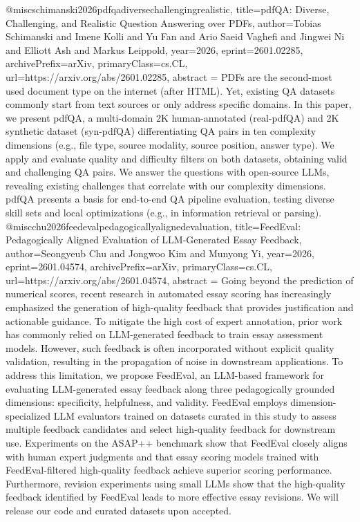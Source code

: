 {}@misc{schimanski2026pdfqadiversechallengingrealistic,
      title={pdfQA: Diverse, Challenging, and Realistic Question Answering over PDFs}, 
      author={Tobias Schimanski and Imene Kolli and Yu Fan and Ario Saeid Vaghefi and Jingwei Ni and Elliott Ash and Markus Leippold},
      year={2026},
      eprint={2601.02285},
      archivePrefix={arXiv},
      primaryClass={cs.CL},
      url={https://arxiv.org/abs/2601.02285},
      abstract = {PDFs are the second-most used document type on the internet (after HTML). Yet, existing QA datasets commonly start from text sources or only address specific domains. In this paper, we present pdfQA, a multi-domain 2K human-annotated (real-pdfQA) and 2K synthetic dataset (syn-pdfQA) differentiating QA pairs in ten complexity dimensions (e.g., file type, source modality, source position, answer type). We apply and evaluate quality and difficulty filters on both datasets, obtaining valid and challenging QA pairs. We answer the questions with open-source LLMs, revealing existing challenges that correlate with our complexity dimensions. pdfQA presents a basis for end-to-end QA pipeline evaluation, testing diverse skill sets and local optimizations (e.g., in information retrieval or parsing).}
}@misc{chu2026feedevalpedagogicallyalignedevaluation,
      title={FeedEval: Pedagogically Aligned Evaluation of LLM-Generated Essay Feedback}, 
      author={Seongyeub Chu and Jongwoo Kim and Munyong Yi},
      year={2026},
      eprint={2601.04574},
      archivePrefix={arXiv},
      primaryClass={cs.CL},
      url={https://arxiv.org/abs/2601.04574},
      abstract = {Going beyond the prediction of numerical scores, recent research in automated essay scoring has increasingly emphasized the generation of high-quality feedback that provides justification and actionable guidance. To mitigate the high cost of expert annotation, prior work has commonly relied on LLM-generated feedback to train essay assessment models. However, such feedback is often incorporated without explicit quality validation, resulting in the propagation of noise in downstream applications. To address this limitation, we propose FeedEval, an LLM-based framework for evaluating LLM-generated essay feedback along three pedagogically grounded dimensions: specificity, helpfulness, and validity. FeedEval employs dimension-specialized LLM evaluators trained on datasets curated in this study to assess multiple feedback candidates and select high-quality feedback for downstream use. Experiments on the ASAP++ benchmark show that FeedEval closely aligns with human expert judgments and that essay scoring models trained with FeedEval-filtered high-quality feedback achieve superior scoring performance. Furthermore, revision experiments using small LLMs show that the high-quality feedback identified by FeedEval leads to more effective essay revisions. We will release our code and curated datasets upon accepted.}
}

